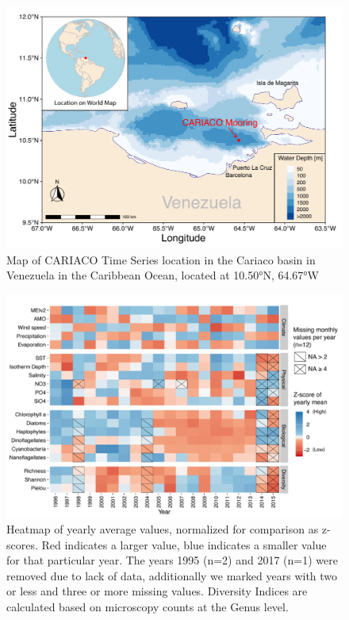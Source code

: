 \documentclass[draft]{agujournal2019}
\begin{document}
\begin{figure}
\noindent\includegraphics[width=\textwidth]{fig/Map_CAR.pdf}
\caption{Map of CARIACO Time Series location in the Cariaco basin in Venezuela in the Caribbean Ocean, located at \ang{10.50}N, \ang{64.67}W}
\label{fig:map}
\end{figure}

\begin{figure}
\noindent\includegraphics[width=\textwidth]{fig/Figure2_ZScores_v2.pdf}
\caption{Heatmap of yearly average values, normalized for comparison as z-scores. Red indicates a larger value, blue indicates a smaller value for that particular year. The years 1995 (n=2) and 2017 (n=1) were removed due to lack of data, additionally we marked years with two or less and three or more missing values. Diversity Indices are calculated based on microscopy counts at the Genus level.}
\label{fig:zscore}
\end{figure}
\end{document}
